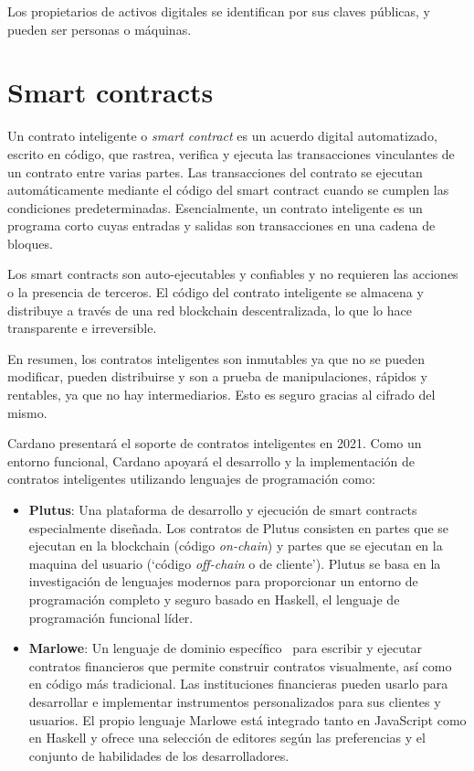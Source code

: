 \documentclass[12pt]{book}
\begin{document}
Los propietarios de activos digitales se identifican por sus claves públicas, y pueden ser personas o máquinas.

\section{Smart contracts}

Un contrato inteligente o \textit{smart contract} es un acuerdo digital automatizado, escrito en código, que rastrea, verifica y ejecuta las transacciones vinculantes de un contrato entre varias partes. Las transacciones del contrato se ejecutan automáticamente mediante el código del smart contract cuando se cumplen las condiciones predeterminadas. Esencialmente, un contrato inteligente es un programa corto cuyas entradas y salidas son transacciones en una cadena de bloques.

Los smart contracts son auto-ejecutables y confiables y no requieren las acciones o la presencia de terceros. El código del contrato inteligente se almacena y distribuye a través de una red blockchain descentralizada, lo que lo hace transparente e irreversible.

En resumen, los contratos inteligentes son inmutables ya que no se pueden modificar, pueden distribuirse y son a prueba de manipulaciones, rápidos y rentables, ya que no hay intermediarios. Esto es seguro gracias al cifrado del mismo.

Cardano presentará el soporte de contratos inteligentes en 2021. Como un entorno funcional, Cardano apoyará el desarrollo y la implementación de contratos inteligentes utilizando lenguajes de programación como:

\begin{itemize}
	\item \textbf{Plutus}: Una plataforma de desarrollo y ejecución de smart contracts especialmente diseñada.
	      Los contratos de Plutus consisten en partes que se ejecutan en la blockchain (código \textit{on-chain}) y partes que se ejecutan en la maquina del usuario (`código \textit{off-chain} o de cliente').
	      Plutus se basa en la investigación de lenguajes modernos para proporcionar un entorno de programación completo y seguro basado en Haskell, el lenguaje de programación funcional líder.

	\item \textbf{Marlowe}: Un lenguaje de dominio específico~\cite{fowler2010dsl} para escribir y ejecutar contratos financieros que permite construir contratos visualmente, así como en código más tradicional. Las instituciones financieras pueden usarlo para desarrollar e implementar instrumentos personalizados para sus clientes y usuarios. El propio lenguaje Marlowe está integrado tanto en JavaScript como en Haskell y ofrece una selección de editores según las preferencias y el conjunto de habilidades de los desarrolladores.
\end{itemize}
\end{document}
